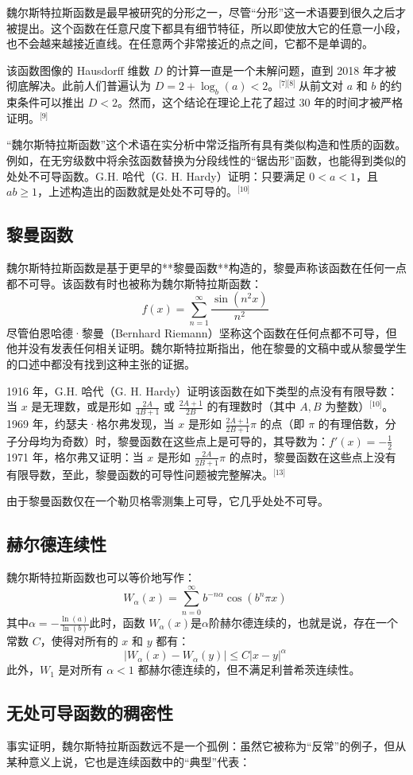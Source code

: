 魏尔斯特拉斯函数是最早被研究的分形之一，尽管“分形”这一术语要到很久之后才被提出。这个函数在任意尺度下都具有细节特征，所以即使放大它的任意一小段，也不会越来越接近直线。在任意两个非常接近的点之间，它都不是单调的。

该函数图像的 Hausdorff 维数 $D$ 的计算一直是一个未解问题，直到 2018 年才被彻底解决。此前人们普遍认为 $D = 2 + \log_b(a) < 2$。\(^\text{[7][8] }\)从前文对 $a$ 和 $b$ 的约束条件可以推出 $D < 2$。然而，这个结论在理论上花了超过 30 年的时间才被严格证明。\(^\text{[9]}\)

“魏尔斯特拉斯函数”这个术语在实分析中常泛指所有具有类似构造和性质的函数。例如，在无穷级数中将余弦函数替换为分段线性的“锯齿形”函数，也能得到类似的处处不可导函数。G.H. 哈代（G. H. Hardy）证明：只要满足 $0 < a < 1$，且 $ab \geq 1$，上述构造出的函数就是处处不可导的。\(^\text{[10]}\)
\subsection{黎曼函数}
魏尔斯特拉斯函数是基于更早的**黎曼函数**构造的，黎曼声称该函数在任何一点都不可导。该函数有时也被称为魏尔斯特拉斯函数：
$$
f(x) = \sum_{n=1}^{\infty} \frac{\sin(n^2 x)}{n^2}~
$$
尽管伯恩哈德·黎曼（Bernhard Riemann）坚称这个函数在任何点都不可导，但他并没有发表任何相关证明。魏尔斯特拉斯指出，他在黎曼的文稿中或从黎曼学生的口述中都没有找到这种主张的证据。

1916 年，G.H. 哈代（G. H. Hardy）证明该函数在如下类型的点没有有限导数：当 $x$ 是无理数，或是形如 $\frac{2A}{4B+1}$ 或 $\frac{2A+1}{2B}$ 的有理数时（其中 $A, B$ 为整数）\(^\text{[10]}\)。1969 年，约瑟夫·格尔弗发现，当 $x$ 是形如 $\frac{2A+1}{2B+1}\pi$ 的点（即 $\pi$ 的有理倍数，分子分母均为奇数）时，黎曼函数在这些点上是可导的，其导数为：$f'(x) = -\frac{1}{2}$1971 年，格尔弗又证明：当 $x$ 是形如 $\frac{2A}{2B+1}\pi$ 的点时，黎曼函数在这些点上没有有限导数，至此，黎曼函数的可导性问题被完整解决。\(^\text{[13]}\)

由于黎曼函数仅在一个勒贝格零测集上可导，它几乎处处不可导。
\subsection{赫尔德连续性}
魏尔斯特拉斯函数也可以等价地写作：
$$
W_\alpha(x) = \sum_{n=0}^{\infty} b^{-n\alpha} \cos(b^n \pi x)~
$$
其中$\alpha = -\frac{\ln(a)}{\ln(b)}$此时，函数 $W_\alpha(x)$是$\alpha$阶赫尔德连续的，也就是说，存在一个常数 $C$，使得对所有的 $x$ 和 $y$ 都有：
$$
|W_\alpha(x) - W_\alpha(y)| \leq C |x - y|^\alpha~
$$
此外，$W_1$ 是对所有 $\alpha < 1$ 都赫尔德连续的，但不满足利普希茨连续性。
\subsection{无处可导函数的稠密性}
事实证明，魏尔斯特拉斯函数远不是一个孤例：虽然它被称为“反常”的例子，但从某种意义上说，它也是连续函数中的“典型”代表：

